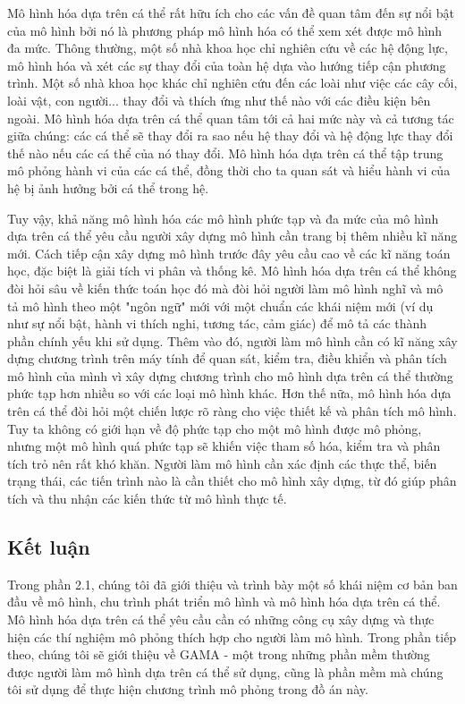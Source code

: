 \documentclass[13pt]{extreport}
\begin{document}
Mô hình hóa dựa trên cá thể rất hữu ích cho các vấn đề quan tâm đến sự nổi bật của mô hình bởi nó là phương pháp mô hình hóa có thể xem xét được mô hình đa mức. Thông thường, một số nhà khoa học chỉ nghiên cứu về các hệ động lực, mô hình hóa và xét các sự thay đổi của toàn hệ dựa vào hướng tiếp cận phương trình. Một số nhà khoa học khác chỉ nghiên cứu đến các loài như việc các cây cối, loài vật, con người... thay đổi và thích ứng như thế nào với các điều kiện bên ngoài. Mô hình hóa dựa trên cá thể quan tâm tới cả hai mức này và cả tương tác giữa chúng: các cá thể sẽ thay đổi ra sao nếu hệ thay đổi và hệ động lực thay đổi thế nào nếu các cá thể của nó thay đổi. Mô hình hóa dựa trên cá thể tập trung mô phỏng hành vi của các cá thể, đồng thời cho ta quan sát và hiểu hành vi của hệ bị ảnh hưởng bởi cá thể trong hệ. 

Tuy vậy, khả năng mô hình hóa các mô hình phức tạp và đa mức của mô hình dựa trên cá thể yêu cầu người xây dựng mô hình cần trang bị thêm nhiều kĩ năng mới. Cách tiếp cận xây dựng mô hình trước đây yêu cầu cao về các kĩ năng toán học, đặc biệt là giải tích vi phân và thống kê. Mô hình hóa dựa trên cá thể không đòi hỏi sâu về kiến thức toán học đó mà đòi hỏi người làm mô hình nghĩ và mô tả mô hình theo một "ngôn ngữ" mới với một chuẩn các khái niệm mới (ví dụ như sự nổi bật, hành vi thích nghi, tương tác, cảm giác) để mô tả các thành phần chính yếu khi sử dụng. Thêm vào đó, người làm mô hình cần có kĩ năng xây dựng chương trình trên máy tính để quan sát, kiểm tra, điều khiển và phân tích mô hình của mình vì xây dựng chương trình cho mô hình dựa trên cá thể thường phức tạp hơn nhiều so với các loại mô hình khác. Hơn thế nữa, mô hình hóa dựa trên cá thể đòi hỏi một chiến lược rõ ràng cho việc thiết kế và phân tích mô hình. Tuy ta không có giới hạn về độ phức tạp cho một mô hình được mô phỏng, nhưng một mô hình quá phức tạp sẽ khiến việc tham số hóa, kiểm tra và phân tích trỏ nên rất khó khăn. Người làm mô hình cần xác định các thực thể, biến trạng thái, các tiến trình nào là cần thiết cho mô hình xây dựng, từ đó giúp phân tích và thu nhận các kiến thức từ mô hình thực tế. 


\subsection{Kết luận}

Trong phần 2.1, chúng tôi đã giới thiệu và trình bày một số khái niệm cơ bản ban đầu về mô hình, chu trình phát triển mô hình và mô hình hóa dựa trên cá thể. Mô hình hóa dựa trên cá thể yêu cầu cần có những công cụ xây dựng và thực hiện các thí nghiệm mô phỏng thích hợp cho người làm mô hình. Trong phần tiếp theo, chúng tôi sẽ giới thiệu về GAMA - một trong những phần mềm thường được người làm mô hình dựa trên cá thể sử dụng, cũng là phần mềm mà chúng tôi sử dụng để thực hiện chương trình mô phỏng trong đồ án này.
\end{document}
